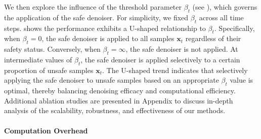 We then explore the influence of the threshold parameter $\beta_{t}$ (see ), which governs the application of the safe denoiser. For simplicity, we fixed $\beta_{t}$ across all time steps.  shows the performance exhibits a U-shaped relationship to $\beta_{t}$. Specifically, when $\beta_{t} = 0$, the safe denoiser is applied to all samples $\mathbf{x}_{t}$ regardless of their safety status. Conversely, when $\beta_{t} = \infty$, the safe denoiser is not applied. At intermediate values of $\beta_{t}$, the safe denoiser is applied selectively to a certain proportion of unsafe samples $\mathbf{x}_{t}$. The U-shaped trend indicates 
%
that selectively applying the safe denoiser to unsafe samples based on an appropriate $\beta_{t}$ value is optimal, thereby balancing denoising efficacy and computational efficiency. Additional ablation studies are presented in Appendix to discuss in-depth analysis of the scalability, robustness, and effectiveness of our methods.  
%

%

\paragraph{Computation Overhead}

